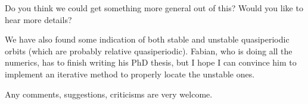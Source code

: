 \begin{description}
Do you think we could get something more general out of this? Would you like to
hear more details?

We have also found some indication of both stable and unstable quasiperiodic
orbits (which are probably relative quasiperiodic). Fabian, who is doing all the
numerics, has to finish writing his PhD thesis, but I hope I can convince him to
implement an iterative method to properly locate the unstable ones.

Any comments, suggestions, criticisms are very welcome.

\end{description}



\renewcommand{\ssp}{a}
